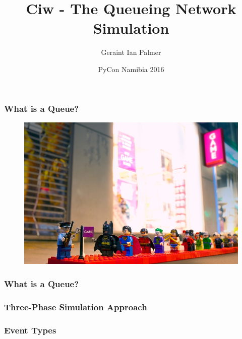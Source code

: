 \documentclass{beamer}
\title
{Ciw - The Queueing Network Simulation}
\author{Geraint Ian Palmer}
\date{PyCon Namibia 2016}
\begin{document}
\frame{\titlepage}

\begin{frame}
\frametitle{What is a Queue?}
\begin{figure}
  
\end{figure}
\end{frame}

\begin{frame}
\begin{figure}
    \includegraphics[width=\textwidth]{legoqueue}
\end{figure}
\end{frame}

\begin{frame}
\frametitle{What is a Queue?}
\begin{figure}
  
\end{figure}
\end{frame}


\begin{frame}
\begin{figure}
    
\end{figure}
\end{frame}

\begin{frame}
\frametitle{Three-Phase Simulation Approach}
\begin{figure}
    
\end{figure}
\end{frame}

\begin{frame}
\frametitle{Event Types}
\begin{center}
\begin{figure}
    
\end{figure}
\end{center}
\end{frame}
\end{document}
